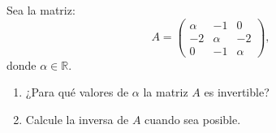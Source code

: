 \documentclass[a4,11pt]{aleph-notas}
\begin{document}
\begin{ejer}
    Sea la matriz:
    \[
        A= \begin{pmatrix}
            \alpha & -1 & 0 \\
            -2 & \alpha & -2 \\
            0 & -1 & \alpha
        \end{pmatrix},
    \]
    donde $\alpha \in \mathbb{R}$.
    \begin{enumerate}
    \item 
        ¿Para qu\'{e} valores de $\alpha$ la matriz $A$ es invertible? 
    \item 
        Calcule la inversa de $A$ cuando sea posible.
    \end{enumerate}
\end{ejer}
\end{document}
